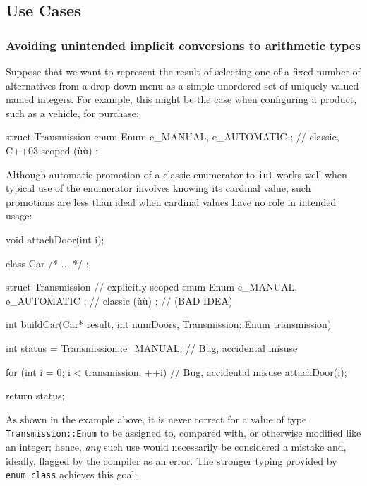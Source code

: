 \subsection[Use Cases]{Use Cases}\label{use-cases-enumclass}

\subsubsection[Avoiding unintended implicit conversions to arithmetic types]{Avoiding unintended implicit conversions to arithmetic types}\label{avoiding-unintended-implicit-conversions-to-arithmetic-types}

Suppose that we want to represent the result of selecting one of a fixed
number of alternatives from a drop-down menu as a simple unordered set
of uniquely valued named integers. For example, this might be the case
when configuring a product, such as a vehicle, for purchase:

\begin{emcppslisting}
struct Transmission
{
    enum Enum { e_MANUAL, e_AUTOMATIC };  // classic, C++03 scoped (ù{}ù)
};
\end{emcppslisting}

\noindent Although automatic promotion of a classic enumerator to \lstinline!int!
works well when typical use of the enumerator involves knowing its
cardinal value, such promotions are less than ideal when cardinal values
have no role in intended usage:

\begin{emcppshiddenlisting}[emcppsbatch=e5]
void attachDoor(int i);
\end{emcppshiddenlisting}
\begin{emcppslisting}[emcppsbatch=e5]
class Car { /* ... */ };

struct Transmission
{                                         // explicitly scoped
    enum Enum { e_MANUAL, e_AUTOMATIC };  // classic (ù{}ù)
};                                        // (BAD IDEA)

int buildCar(Car* result, int numDoors, Transmission::Enum transmission)
{
    int status = Transmission::e_MANUAL;    // Bug, accidental misuse

    for (int i = 0; i < transmission; ++i)  // Bug, accidental misuse
    {
         attachDoor(i);
    }

    return status;
}
\end{emcppslisting}

\noindent As shown in the example above, it is never correct for a value of type
\lstinline!Transmission::Enum! to be assigned to, compared with, or otherwise
modified like an integer; hence, \emph{any} such use would necessarily
be considered a mistake and, ideally, flagged by the compiler as an
error. The stronger typing provided by \lstinline!enum!~\lstinline!class!
achieves this goal:

